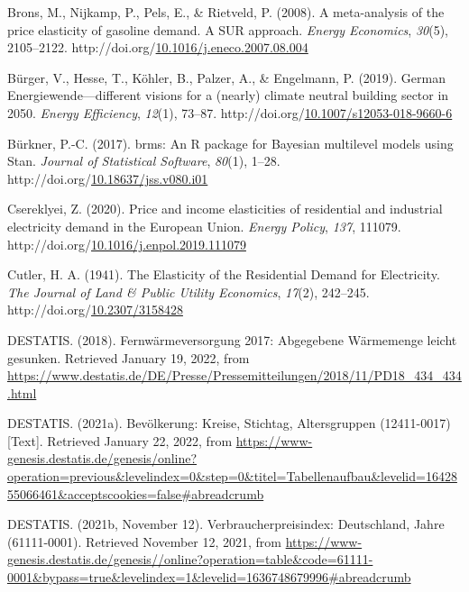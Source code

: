 \documentclass[12pt,twoside]{reedthesis}
\newlength{\cslhangindent}
\newenvironment{CSLReferences}[2] %
 {%
  \setlength{\parindent}{0pt}
  \ifodd #1 \everypar{\setlength{\hangindent}{\cslhangindent}}\ignorespaces\fi
  \ifnum #2 > 0
  \setlength{\parskip}{#2\baselineskip}
  \fi
 }%
 {}
\begin{document}
\begin{CSLReferences}{1}{0}
\leavevmode{}%
Brons, M., Nijkamp, P., Pels, E., \& Rietveld, P. (2008). A meta-analysis of the price elasticity of gasoline demand. A SUR approach. \emph{Energy Economics}, \emph{30}(5), 2105--2122. http://doi.org/\href{https://doi.org/10.1016/j.eneco.2007.08.004}{10.1016/j.eneco.2007.08.004}

\leavevmode{}%
Bürger, V., Hesse, T., Köhler, B., Palzer, A., \& Engelmann, P. (2019). German Energiewende---different visions for a (nearly) climate neutral building sector in 2050. \emph{Energy Efficiency}, \emph{12}(1), 73--87. http://doi.org/\href{https://doi.org/10.1007/s12053-018-9660-6}{10.1007/s12053-018-9660-6}

\leavevmode{}%
Bürkner, P.-C. (2017). brms: An R package for Bayesian multilevel models using Stan. \emph{Journal of Statistical Software}, \emph{80}(1), 1--28. http://doi.org/\href{https://doi.org/10.18637/jss.v080.i01}{10.18637/jss.v080.i01}

\leavevmode{}%
Csereklyei, Z. (2020). Price and income elasticities of residential and industrial electricity demand in the European Union. \emph{Energy Policy}, \emph{137}, 111079. http://doi.org/\href{https://doi.org/10.1016/j.enpol.2019.111079}{10.1016/j.enpol.2019.111079}

\leavevmode{}%
Cutler, H. A. (1941). The Elasticity of the Residential Demand for Electricity. \emph{The Journal of Land \& Public Utility Economics}, \emph{17}(2), 242--245. http://doi.org/\href{https://doi.org/10.2307/3158428}{10.2307/3158428}

\leavevmode{}%
DESTATIS. (2018). Fernwärmeversorgung 2017: Abgegebene Wärmemenge leicht gesunken. Retrieved January 19, 2022, from \url{https://www.destatis.de/DE/Presse/Pressemitteilungen/2018/11/PD18_434_434.html}

\leavevmode{}%
DESTATIS. (2021a). Bevölkerung: Kreise, Stichtag, Altersgruppen (12411-0017) {[}Text{]}. Retrieved January 22, 2022, from \url{https://www-genesis.destatis.de/genesis/online?operation=previous\&levelindex=0\&step=0\&titel=Tabellenaufbau\&levelid=1642855066461\&acceptscookies=false\#abreadcrumb}

\leavevmode{}%
DESTATIS. (2021b, November 12). Verbraucherpreisindex: Deutschland, Jahre (61111-0001). Retrieved November 12, 2021, from \url{https://www-genesis.destatis.de/genesis//online?operation=table\&code=61111-0001\&bypass=true\&levelindex=1\&levelid=1636748679996\#abreadcrumb}


\end{CSLReferences}
\end{document}
